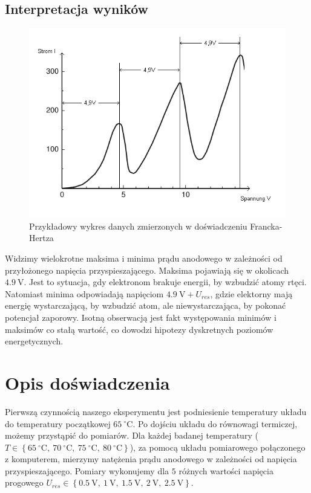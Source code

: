 \documentclass[paper=a4, fontsize=12pt]{scrartcl}
\begin{document}
\subsection{Interpretacja wyników}
\begin{figure}[h!]
\centering
\includegraphics[width=0.5\linewidth]{franck_hertz_02}
\caption{Przykładowy wykres danych zmierzonych w doświadczeniu Francka-Hertza}
\label{fig:franck_hertz_02}
\end{figure}
Widzimy wielokrotne maksima i minima prądu anodowego w zależności od przyłożonego napięcia przyspieszającego. Maksima pojawiają się w okolicach $4.9\:\mathrm{V}$. Jest to sytuacja, gdy elektronom brakuje energii, by wzbudzić atomy rtęci. Natomiast minima odpowiadają napięciom $4.9\:\mathrm{V}+U_{res}$, gdzie elektorny mają energię wystarczającą, by wzbudzić atom, ale niewystarczająca, by pokonać potencjał zaporowy. Isotną obserwacją jest fakt występowania minimów i maksimów co stałą wartość, co dowodzi hipotezy dyskretnych poziomów energetycznych.
\newpage
\section{Opis doświadczenia}
Pierwszą czynnością naszego eksperymentu jest podniesienie temperatury układu do temperatury początkowej $65\:^\circ \mathrm{C}$. Po dojściu układu do równowagi termiczej, możemy przystąpić do pomiarów. Dla każdej badanej temperatury ($T\in\left\lbrace65\:^\circ \mathrm{C},\: 70\:^\circ \mathrm{C},\: 75\:^\circ \mathrm{C},\: 80\:^\circ \mathrm{C}\right\rbrace$), za pomocą układu pomiarowego połączonego z komputerem, mierzymy natężenia prądu anodowego w zależności od napięcia przyspieszającego. Pomiary wykonujemy dla $5$ różnych wartości napięcia progowego $U_{res}\in\left\lbrace0.5\:\mathrm{V},\:1\:\mathrm{V},\:1.5\:\mathrm{V},\:2\:\mathrm{V},\:2.5\:\mathrm{V}\right\rbrace$.
\end{document}
